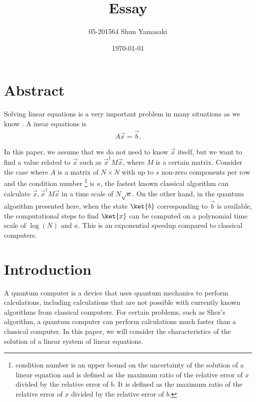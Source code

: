 \documentclass[b5paper,papersize,dvipdfmx,fleqn]{jsarticle}
\begin{document}
\title{Essay}
\author{05-201564 Shun Yamasaki}
\date{\today}
\maketitle

\section{Abstract}
Solving linear equations is a very important problem in many situations as we know \cite{Harrow2009}. A inear equations is
\begin{eqnarray}
  A\vec{x} = \vec{b}.
\end{eqnarray}

In this paper, we assume that we do not need to know $\vec{x}$ itself, but we want to find a value related to $\vec{x}$ such as $\vec{x}^\dagger M \vec{x}$, where $M$ is a certain matrix. Consider the case where $A$ is a matrix of $N\times N$ with up to $s$ non-zero components per row and the condition number \footnote{condition number is an upper bound on the uncertainty of the solution of a linear equation and is defined as the maximum ratio of the relative error of $x$ divided by the relative error of $b$. It is defined as the maximum ratio of the relative error of $x$ divided by the relative error of $b$.} is $\kappa $, the fastest known classical algorithm can calculate $\vec{x}, \vec{x}^\dagger M\vec{x}$ in a time scale of $N\sqrt{\kappa }$.
On the other hand, in the quantum algorithm presented here, when the state $\ket{b}$ corresponding to $\vec{b}$ is available, the computational steps to find $\ket{x}$ can be computed on a polynomial time scale of $\log(N)$ and $\kappa $. This is an exponential speedup compared to classical computers.

\section{Introduction}

A quantum computer is a device that uses quantum mechanics to perform calculations, including calculations that are not possible with currently known algorithms from classical computers. For certain problems, such as Shor's algorithm, a quantum computer can perform calculations much faster than a classical computer. In this paper, we will consider the characteristics of the solution of a linear system of linear equations.
\end{document}
